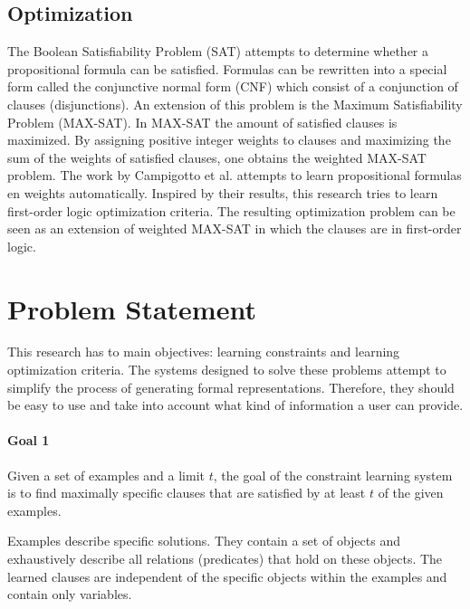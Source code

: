 \documentclass{llncs}
\begin{document}
\subsection{Optimization}
The Boolean Satisfiability Problem (SAT) attempts to determine whether a propositional formula can be satisfied.
Formulas can be rewritten into a special form called the conjunctive normal form (CNF) which consist of a conjunction of clauses (disjunctions).
An extension of this problem is the Maximum Satisfiability Problem (MAX-SAT).
In MAX-SAT the amount of satisfied clauses is maximized.
By assigning positive integer weights to clauses and maximizing the sum of the weights of satisfied clauses, one obtains the weighted MAX-SAT problem.
The work by Campigotto et al.\cite{campigotto2011active} attempts to learn propositional formulas en weights automatically.
Inspired by their results, this research tries to learn first-order logic optimization criteria.
The resulting optimization problem can be seen as an extension of weighted MAX-SAT in which the clauses are in first-order logic.

\section{Problem Statement}
This research has to main objectives: learning constraints and learning optimization criteria.
The systems designed to solve these problems attempt to simplify the process of generating formal representations.
Therefore, they should be easy to use and take into account what kind of information a user can provide.

\begin{framed}
  \noindent
  \begin{minipage}{\textwidth}
    \paragraph*{Goal 1}
    Given a set of examples and a limit $t$, the goal of the constraint learning system is to find maximally specific clauses that are satisfied by at least $t$ of the given examples.
  \end{minipage}
\end{framed}

Examples describe specific solutions.
They contain a set of objects and exhaustively describe all relations (predicates) that hold on these objects.
The learned clauses are independent of the specific objects within the examples and contain only variables.
\end{document}
